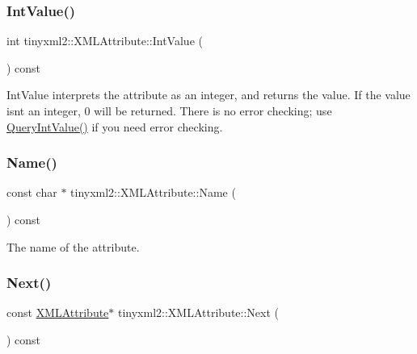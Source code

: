 \mbox{\label{classtinyxml2_1_1_x_m_l_attribute_adfa2433f0fdafd5c3880936de9affa80}} 
\subsubsection{\texorpdfstring{Int\+Value()}{IntValue()}}
{\footnotesize\ttfamily int tinyxml2\+::\+X\+M\+L\+Attribute\+::\+Int\+Value (\begin{DoxyParamCaption}{ }\end{DoxyParamCaption}) const\hspace{0.3cm}{\ttfamily [inline]}}

Int\+Value interprets the attribute as an integer, and returns the value. If the value isn\textquotesingle{}t an integer, 0 will be returned. There is no error checking; use \hyperlink{classtinyxml2_1_1_x_m_l_attribute_a6d5176260db00ea301c01af8457cd993}{Query\+Int\+Value()} if you need error checking. \mbox{\label{classtinyxml2_1_1_x_m_l_attribute_a5a5c135d24cce7abda6f17301c6274d8}} 
\subsubsection{\texorpdfstring{Name()}{Name()}}
{\footnotesize\ttfamily const char $\ast$ tinyxml2\+::\+X\+M\+L\+Attribute\+::\+Name (\begin{DoxyParamCaption}{ }\end{DoxyParamCaption}) const}



The name of the attribute. 

\mbox{\label{classtinyxml2_1_1_x_m_l_attribute_aee53571b21e7ce5421eb929523a8bbe6}} 
\subsubsection{\texorpdfstring{Next()}{Next()}}
{\footnotesize\ttfamily const \hyperlink{classtinyxml2_1_1_x_m_l_attribute}{X\+M\+L\+Attribute}$\ast$ tinyxml2\+::\+X\+M\+L\+Attribute\+::\+Next (\begin{DoxyParamCaption}{ }\end{DoxyParamCaption}) const\hspace{0.3cm}{\ttfamily [inline]}}



